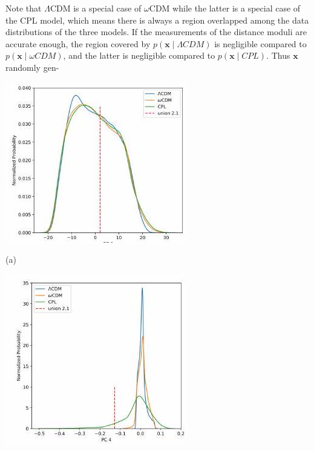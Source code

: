 \documentclass[10pt]{article}
\begin{document}
Note that $\Lambda \mathrm{CDM}$ is a special case of $\omega \mathrm{CDM}$ while the latter is a special case of the CPL model, which means there is always a region overlapped among the data distributions of the three models. If the measurements of the distance moduli are accurate enough, the region covered by $p(\boldsymbol{x} \mid \Lambda C D M)$ is negligible compared to $p(\boldsymbol{x} \mid \omega C D M)$, and the latter is negligible compared to $p(\boldsymbol{x} \mid C P L)$. Thus $\boldsymbol{x}$ randomly gen-

\includegraphics[max width=\textwidth]{2022_04_28_9be604c658276336b08cg-09}

(a)

\includegraphics[max width=\textwidth]{2022_04_28_9be604c658276336b08cg-09(1)}
\end{document}
